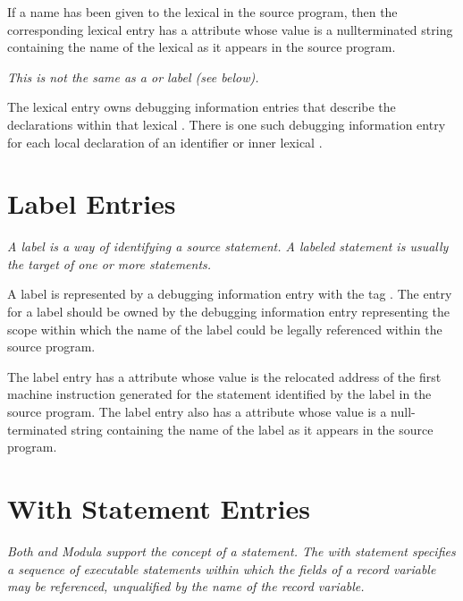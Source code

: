 If a name has been given to the 
lexical  
in the source
program, then the corresponding 
lexical  entry has a
 attribute whose 
value is a null\dash terminated string
containing the name of the lexical  
as it appears in
the source program.

\textit{This is not the same as a  or 
 label (see below).}

The lexical  entry owns 
debugging information entries that
describe the declarations within that lexical . 
There is
one such debugging information entry for each local declaration
of an identifier or inner lexical .

\section{Label Entries}
\label{chap:labelentries}
\textit{A label is a way of identifying a source statement. A labeled
statement is usually the target of one or more 
statements.
}

A label is represented by a debugging information entry with
the 
tag . 
The entry for a label should be owned by
the debugging information entry representing the scope within
which the name of the label could be legally referenced within
the source program.

The label entry has a  attribute whose value
is the relocated address of the first machine instruction
generated for the statement identified by the label in
the source program.  The label entry also has a 
 attribute 
whose value is a null-terminated string containing
the name of the label as it appears in the source program.


\section{With Statement Entries}
\label{chap:withstatemententries}

\textit{Both  and 
Modula support the concept of a 
statement. The with statement specifies a sequence of
executable statements within which the fields of a record
variable may be referenced, unqualified by the name of the
record variable.}

